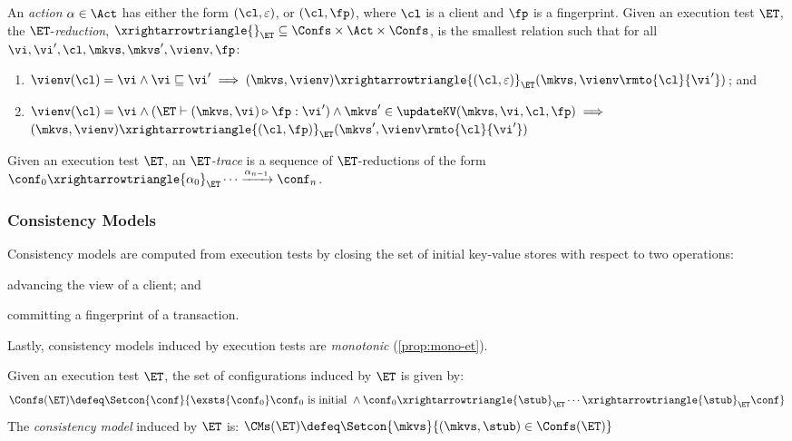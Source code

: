 \begin{definition}[$\ET$-reductions]
\label{def:reduction}
An \emph{action} $\alpha \in \Act$ has either the form $(\cl, \varepsilon)$, 
or $(\cl, \fp)$, 
where $\cl$ is a client and $\fp$ is a fingerprint. 
Given an execution test $\ET$, the $\ET$-\emph{reduction}, 
$\xrightarrowtriangle{}_{\ET} \subseteq \Confs \times \Act \times \Confs$, 
is the smallest relation such that for all $\vi, \vi', \cl, \mkvs, \mkvs', \vienv, \fp$:
\begin{enumerate}
	\item 
    $
    \vienv(\cl) = \vi 
    \wedge \vi \sqsubseteq \vi' 
    \implies (\mkvs, \vienv) \xrightarrowtriangle{(\cl, \varepsilon)}_{\ET} 
    (\mkvs, \vienv\rmto{\cl}{\vi'})$; and
	\item 
    $\vienv(\cl) = \vi
        \wedge (\ET \vdash (\mkvs, \vi) \triangleright \fp: \vi')  
        \wedge \mkvs' \in \updateKV(\mkvs, \vi, \cl, \fp) \implies
	$  \\
	\phantom{a} \hfill 
	$(\mkvs, \vienv) \xrightarrowtriangle{(\cl, \fp)}_{\ET} (\mkvs', \vienv\rmto{\cl}{\vi'})$
\end{enumerate}
%
Given an execution test $\ET$, an \emph{$\ET$-trace} is a sequence of $\ET$-reductions of the form $\conf_{0} \xrightarrowtriangle{\alpha_{0}}_{\ET} \cdots 
\xrightarrow{\alpha_{n-1}} \conf_{n}$.
\end{definition}
%
%
%
%
\subsubsection{Consistency Models}
Consistency models are computed from execution tests by closing the set of initial key-value stores with respect to two operations: 
\begin{enumerate*}[label=(\arabic*)]
	\item advancing the view of a client; and 
	\item committing a fingerprint of a transaction. 
\end{enumerate*}
Lastly, consistency models induced by execution tests are \emph{monotonic} (\cref{prop:mono-et}).
%
%
\begin{definition}
\label{def:cm}
Given an execution test $\ET$, the set of configurations induced by $\ET$ is given by:
\[
\Confs(\ET) \defeq \Setcon{ \conf}{ \exsts{\conf_0} \conf_0 \text{ is initial } \wedge \conf_0 \xrightarrowtriangle{\stub}_{\ET} \cdots \xrightarrowtriangle{\stub}_{\ET} \conf }
\]
The \emph{consistency model} induced by $\ET$ is:
\( 
\CMs(\ET) \defeq \Setcon{ \mkvs }{ (\mkvs, \stub) \in \Confs(\ET) }
\)
\end{definition}




